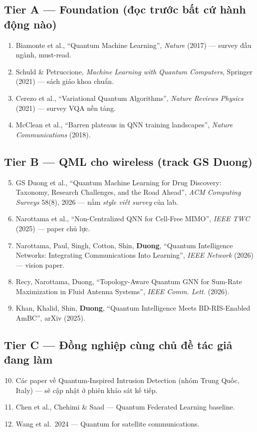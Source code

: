 \documentclass[11pt,a4paper]{article}
\begin{document}
\subsection{Tier A --- Foundation (đọc trước bất cứ hành động nào)}
\begin{enumerate}
  \item Biamonte et al., ``Quantum Machine Learning'', \textit{Nature} (2017) --- survey đầu ngành, must-read.
  \item Schuld \& Petruccione, \textit{Machine Learning with Quantum Computers}, Springer (2021) --- sách giáo khoa chuẩn.
  \item Cerezo et al., ``Variational Quantum Algorithms'', \textit{Nature Reviews Physics} (2021) --- survey VQA nền tảng.
  \item McClean et al., ``Barren plateaus in QNN training landscapes'', \textit{Nature Communications} (2018).
\end{enumerate}

\subsection{Tier B --- QML cho wireless (track GS Duong)}
\begin{enumerate}\setcounter{enumi}{4}
  \item GS Duong et al., ``Quantum Machine Learning for Drug Discovery: Taxonomy, Research Challenges, and the Road Ahead'', \textit{ACM Computing Surveys} 58(8), 2026 --- nắm \textit{style viết survey} của lab.
  \item Narottama et al., ``Non-Centralized QNN for Cell-Free MIMO'', \textit{IEEE TWC} (2025) --- paper chủ lực.
  \item Narottama, Paul, Singh, Cotton, Shin, \textbf{Duong}, ``Quantum Intelligence Networks: Integrating Communications Into Learning'', \textit{IEEE Network} (2026) --- vision paper.
  \item Recy, Narottama, Duong, ``Topology-Aware Quantum GNN for Sum-Rate Maximization in Fluid Antenna Systems'', \textit{IEEE Comm. Lett.} (2026).
  \item Khan, Khalid, Shin, \textbf{Duong}, ``Quantum Intelligence Meets BD-RIS-Enabled AmBC'', arXiv (2025).
\end{enumerate}

\subsection{Tier C --- Đồng nghiệp cùng chủ đề tác giả đang làm}
\begin{enumerate}\setcounter{enumi}{9}
  \item Các paper về Quantum-Inspired Intrusion Detection (nhóm Trung Quốc, Italy) --- sẽ cập nhật ở phiên khảo sát kế tiếp.
  \item Chen et al., Chehimi \& Saad --- Quantum Federated Learning baseline.
  \item Wang et al.\ 2024 --- Quantum for satellite communications.
\end{enumerate}
\end{document}
